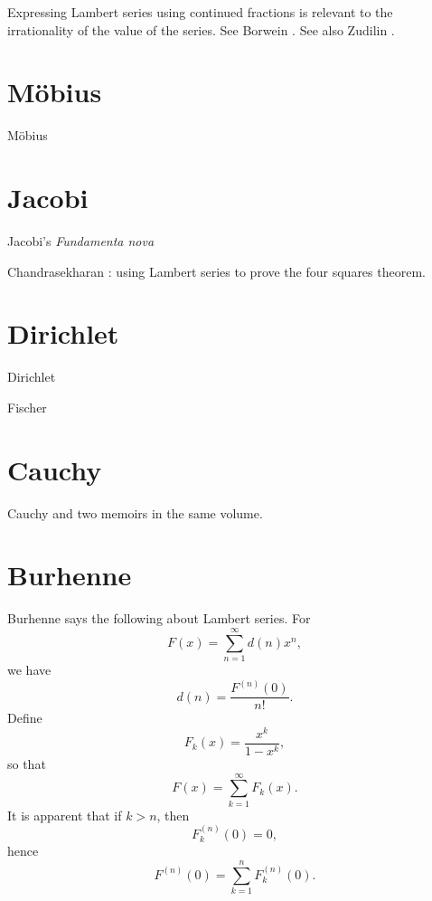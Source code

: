 \documentclass{article}
\begin{document}
Expressing Lambert series using continued fractions is relevant to the irrationality of the value of the series. See
Borwein \cite{borwein}. See also Zudilin \cite{zudilin}. 




\section{M\"obius}
M\"obius \cite{mobius}


\section{Jacobi}
Jacobi's {\em Fundamenta nova} \cite[\S 40, 66 and p.~185]{fundamenta}

Chandrasekharan \cite[Chapter X]{chandrasekharan}: using Lambert series to prove the four squares theorem.

\section{Dirichlet}
Dirichlet \cite{dirichlet1838}

Fischer \cite{fischer}

\section{Cauchy}
Cauchy \cite{cauchy1843a} and \cite{cauchy1843b} two memoirs in the same volume.


\section{Burhenne}
Burhenne \cite{burhenne} says the following about Lambert series.
For
\[
F(x) = \sum_{n=1}^\infty d(n) x^n,
\]
we have
\[
d(n) = \frac{F^{(n)}(0)}{n!}.
\]
Define
\[
F_k(x) = \frac{x^k}{1-x^k},
\]
so that
\[
F(x) = \sum_{k=1}^\infty F_k(x).
\]
It is apparent that if $k>n$, then
\[
F_k^{(n)}(0) = 0,
\]
hence
\[
F^{(n)}(0)=
 \sum_{k=1}^n F_k^{(n)}(0).
\]
\end{document}
